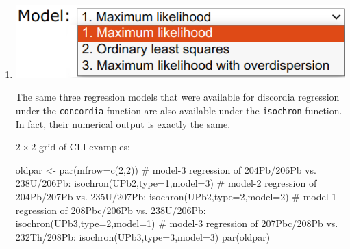 \begin{refsection}
\begin{enumerate}
\item \noindent\begin{minipage}[t]{.45\linewidth}
  \strut\vspace*{-\baselineskip}\newline
  \includegraphics[width=\linewidth]{../figures/UPbIsochronModels.png}
\end{minipage}
\begin{minipage}[t]{.55\linewidth}
  The same three regression models that were available for discordia
  regression under the \texttt{concordia} function are also available
  under the \texttt{isochron} function.  In fact, their numerical
  output is exactly the same.
\end{minipage}

\noindent $2\times{2}$ grid of CLI examples:
\begin{console}
oldpar <- par(mfrow=c(2,2))
# model-3 regression of 204Pb/206Pb vs. 238U/206Pb:
isochron(UPb2,type=1,model=3)
# model-2 regression of 204Pb/207Pb vs. 235U/207Pb:
isochron(UPb2,type=2,model=2)
# model-1 regression of 208Pbc/206Pb vs. 238U/206Pb:
isochron(UPb3,type=2,model=1)
# model-3 regression of 207Pbc/208Pb vs. 232Th/208Pb:
isochron(UPb3,type=3,model=3)
par(oldpar)
\end{console}


\end{enumerate}
\end{refsection}
